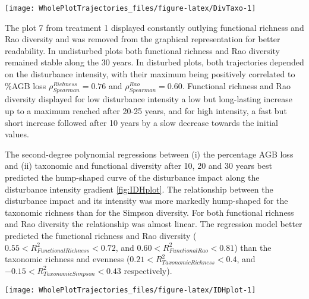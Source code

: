 \documentclass[fleqn,10pt]{ArtEcoFoG} %
\begin{document}
\begin{figure*}

{\centering \texttt{[image: WholePlotTrajectories\_files/figure-latex/DivTaxo-1]} 

}

\caption{Trajectories over 30 years of the difference with the 1989 inventory (2 years after disturbance) of community taxonomic richness \textbf{(a)}, Simpson diversity \textbf{(b)}, functional richness \textbf{(c)}, and Rao diversity \textbf{(d)}. Shaded areas are the credibility intervals }\label{fig:DivTaxo}
\end{figure*}

The plot 7 from treatment 1 displayed constantly outlying functional
richness and Rao diversity and was removed from the graphical
representation for better readability. In undisturbed plots both
functional richness and Rao diversity remained stable along the 30
years. In disturbed plots, both trajectories depended on the disturbance
intensity, with their maximum being positively correlated to \%AGB loss
\(\rho_{Spearman}^{Richness}=0.76\) and \(\rho_{Spearman}^{Rao}=0.60\).
Functional richness and Rao diversity displayed for low disturbance
intensity a low but long-lasting increase up to a maximum reached after
20-25 years, and for high intensity, a fast but short increase followed
after 10 years by a slow decrease towards the initial values.

The second-degree polynomial regressions between (i) the percentage AGB
loss and (ii) taxonomic and functional diversity after 10, 20 and 30
years best predicted the hump-shaped curve of the disturbance impact
along the disturbance intensity gradient \ref{fig:IDHplot}. The
relationship between the disturbance impact and its intensity was more
markedly hump-shaped for the taxonomic richness than for the Simpson
diversity. For both functional richness and Rao diversity the
relationship was almost linear. The regression model better predicted
the functional richness and Rao diversity
(\(0.55<R^2_{Functional Richness}<0.72\), and
\(0.60<R^2_{Functional Rao}<0.81\)) than the taxonomic richness and
evenness (\(0.21<R^2_{Taxonomic Richness}<0.4\), and
\(-0.15<R^2_{Taxonomic Simpson}<0.43\) respectively).

\begin{figure*}

{\centering \texttt{[image: WholePlotTrajectories\_files/figure-latex/IDHplot-1]} 

}

\caption{Relationship between the initial \%AGB loss and community taxonomic richness \textbf{(a)}, taxonomic evenness \textbf{(b)}, functional richness \textbf{(c)},and functional evenness \textbf{(d)} at 10, 20 and 30 years after disturbance}\label{fig:IDHplot}
\end{figure*}
\end{document}
